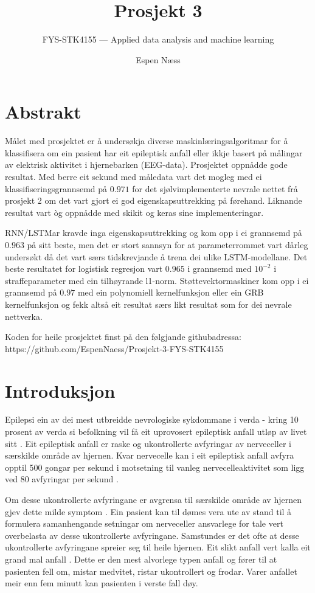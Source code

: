 \documentclass[oneside, nynorsk]{book}
\title{Prosjekt 3}        %
\subtitle{FYS-STK4155 --- Applied data analysis and machine learning}         %
\author{Espen Næss}                      %
\begin{document}
\let\cleardoublepage\clearpage
\ififorside{}
\let\cleardoublepage\clearpage
\chapter*{Abstrakt}                   %
Målet med prosjektet er å undersøkja diverse maskinlæringsalgoritmar for å klassifisera om ein pasient har eit epileptisk anfall eller ikkje
basert på målingar av elektrisk aktivitet i hjernebarken (EEG-data).
Prosjektet oppnådde gode resultat. Med berre eit sekund med måledata vart det mogleg med
ei klassifiseringsgrannsemd på $0.971$ for det sjølvimplementerte nevrale nettet frå prosjekt 2 om det vart gjort ei god eigenskapsuttrekking på førehand. Liknande resultat vart òg oppnådde med skikit og keras sine implementeringar.

RNN/LSTMar kravde inga eigenskapsuttrekking og kom opp i ei grannsemd på $0.963$ på sitt beste,
men det er stort sannsyn for at parameterrommet vart dårleg undersøkt då det vart særs tidskrevjande å trena dei ulike LSTM-modellane.
Det beste resultatet for logistisk regresjon vart $0.965$ i grannsemd med $10^{-2}$ i straffeparameter med ein tilhøyrande l1-norm.
Støttevektormaskiner kom opp i ei grannsemd på $0.97$ med ein polynomiell kernelfunksjon eller ein GRB kernelfunksjon og fekk altså eit resultat særs likt resultat som for dei nevrale nettverka.

Koden for heile prosjektet finst på den følgjande githubadressa: \\
https://github.com/EspenNaess/Prosjekt-3-FYS-STK4155
\tableofcontents{}
\mainmatter{}
\chapter{Introduksjon}                    %
Epilepsi ein av dei mest utbreidde nevrologiske sykdommane i verda - kring 10 prosent av verda si befolkning
vil få eit uprovosert epileptisk anfall utløp av livet sitt \cite{Epil}.
Eit epileptisk anfall er raske og ukontrollerte avfyringar av nerveceller i særskilde område av hjernen.
Kvar nervecelle kan i eit epileptisk anfall avfyra opptil 500 gongar per sekund
i motsetning til vanleg nervecelleaktivitet som ligg ved 80 avfyringar per sekund \cite{Epil2}.

Om desse ukontrollerte avfyringane er avgrensa til særskilde område av hjernen gjev dette milde symptom \cite{Epil3}.
Ein pasient kan til dømes vera ute av stand til å formulera samanhengande setningar om nerveceller ansvarlege for tale vert overbelasta av desse ukontrollerte avfyringane.
Samstundes er det ofte at desse ukontrollerte avfyringane spreier seg til heile hjernen.
Eit slikt anfall vert kalla eit grand mal anfall \cite{Epil3}.
Dette er den mest alvorlege typen anfall og fører til at pasienten fell om, mistar medvitet, ristar ukontrollert og frodar.
Varer anfallet meir enn fem minutt kan pasienten i verste fall døy.
\end{document}
